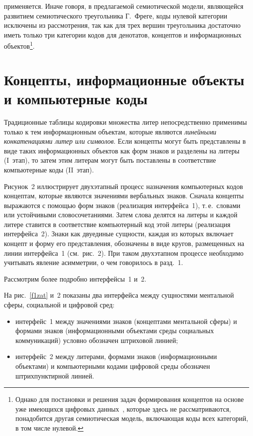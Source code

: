\begin{multicols}{2}


\noindent
 применяется. Иначе говоря, 
в предлагаемой семиотической модели, являющейся развитием семиотического 
треугольника Г.~Фреге, коды нулевой категории исключены из рассмотрения, так как для 
трех вершин треугольника достаточно иметь только три категории кодов для денотатов, 
концептов и информационных объектов\footnote[1]{Однако для постановки и решения задач 
формирования концептов на основе уже имеющихся цифровых данных~\cite{8zat}, которые здесь не 
рассматриваются, понадобится другая семиотическая модель, включающая коды всех категорий, в том числе 
нулевой.}.


\vspace*{-6pt}
\section{Концепты, информационные объекты и компьютерные коды}

   Традиционные таблицы кодировки множества литер непосредственно применимы только 
к тем информационным объектам, которые являются \textit{линейными конкатенациями 
литер или символов}. Если концепты могут быть представлены в виде таких 
информационных объектов как форм знаков и разделены на литеры (I~этап), то затем этим 
литерам могут быть поставлены в соответствие компьютерные коды (II~этап).
   
   Рисунок~2 иллюстрирует двухэтапный процесс назначения компьютерных кодов 
концептам, которые являются значениями вербальных знаков. Сначала концепты 
выражаются с помощью форм знаков (реализация интерфейса~1), т.\,е.\ словами или 
устойчивыми словосочетаниями. Затем слова делятся на литеры и каждой литере ставится в 
соответствие компьютерный код этой литеры (реализация интерфейса~2). Знаки как 
двуединые сущности, каждая из которых включает концепт и форму его представления, 
обозначены в виде кругов, размещенных на линии интерфейса~1 (см.\ рис.~2). При 
таком двухэтапном процессе необходимо учитывать явление асимметрии, о чем говорилось в 
разд.~1. 

Рассмотрим более подробно интерфейсы~1 и~2.
\pagebreak
   
   На рис.~\ref{f1zat} и~2 показаны два интерфейса между сущностями ментальной 
сферы, социальной и цифровой сред:
   \begin{itemize}
\item интерфейс~1 между значениями знаков (концептами ментальной сферы) и 
формами знаков (информационными объектами среды социальных коммуникаций) 
условно обозначен штриховой линией;
\item интерфейс~2 между литерами, формами знаков (информационными объектами) 
и компьютерными кодами цифровой среды обозначен штрихпунктирной линией.
\end{itemize}
   

\end{multicols}
